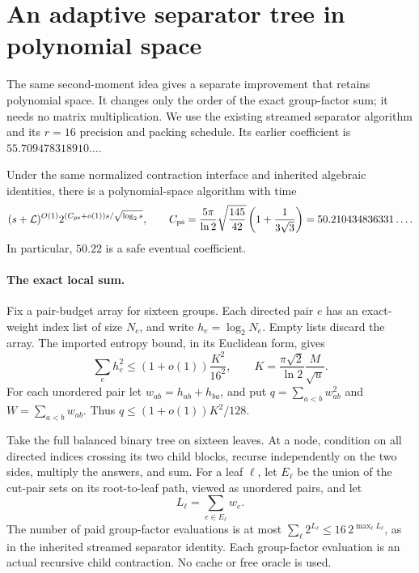 \section{An adaptive separator tree in polynomial space}
\label{sec:adaptive-separator-new}

The same second-moment idea gives a separate improvement that retains
polynomial space. It changes only the order of the exact group-factor sum;
it needs no matrix multiplication. We use the existing streamed separator
algorithm and its $r=16$ precision and packing schedule. Its earlier
coefficient is $55.709478318910\ldots$.

\begin{theorem}
\label{thm:adaptive-separator-new}
Under the same normalized contraction interface and inherited algebraic
identities, there is a polynomial-space algorithm with time
\[
 (s+\mathcal L)^{O(1)}
 2^{(C_{\rm ps}+o(1))s/\sqrt{\log_2s}},\qquad
 C_{\rm ps}=\frac{5\pi}{\ln2}\sqrt{\frac{145}{42}}
 \left(1+\frac1{3\sqrt3}\right)
 =50.210434836331\ldots .
\]
In particular, $50.22$ is a safe eventual coefficient.
\end{theorem}

\paragraph{The exact local sum.}
Fix a pair-budget array for sixteen groups. Each directed pair $e$ has
an exact-weight index list of size $N_e$, and write $h_e=\log_2N_e$.
Empty lists discard the array. The imported entropy bound, in its
Euclidean form, gives
\[
 \sum_e h_e^2\le (1+o(1))\frac{K^2}{16^2},\qquad
 K=\frac{\pi\sqrt2}{\ln2}\frac{M}{\sqrt u}.
\]
For each unordered pair let $w_{ab}=h_{ab}+h_{ba}$, and put
$q=\sum_{a<b}w_{ab}^2$ and $W=\sum_{a<b}w_{ab}$. Thus
$q\le(1+o(1))K^2/128$.

Take the full balanced binary tree on sixteen leaves. At a node, condition
on all directed indices crossing its two child blocks, recurse independently
on the two sides, multiply the answers, and sum. For a leaf $\ell$, let
$E_\ell$ be the union of the cut-pair sets on its root-to-leaf path, viewed
as unordered pairs, and let
\[
 L_\ell=\sum_{e\in E_\ell}w_e.
\]
The number of paid group-factor evaluations is at most
$\sum_\ell2^{L_\ell}\le16\,2^{\max_\ell L_\ell}$, as in the inherited
streamed separator identity. Each group-factor evaluation is an actual
recursive child contraction. No cache or free oracle is used.

